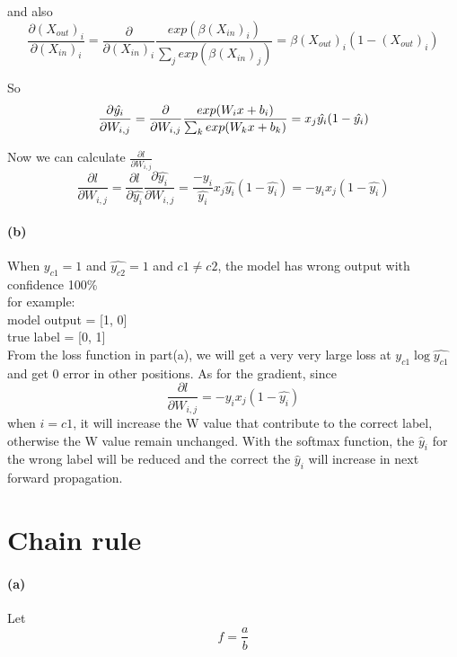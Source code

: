 \documentclass{article}
\begin{document}
and also
\begin{equation}
\frac{\partial (X_{out})_i }{\partial (X_{in})_i }
= \frac{\partial}{\partial (X_{in})_i} \frac{exp(\beta (X_{in})_i)}{\sum\nolimits_j exp(\beta (X_{in})_j)} = \beta (X_{out})_i (1-(X_{out})_i)
\end{equation}

So 
\begin{equation}
\frac{\partial \hat{y_i}}{\partial W_{i,j}} 
= \frac{\partial }{\partial W_{i,j}} \frac{exp(W_{i}x+b_i)}{\sum\nolimits_k exp(W_{k}x+b_k)} \\
= x_{j} \hat{y_i} (1- \hat{y_i})
\end{equation}

Now we can calculate $\frac{\partial l}{\partial W_{i,j}}$
\begin{equation}
\frac{\partial l}{\partial W_{i,j}} = \frac{\partial l}{\partial \hat{y_i}} \frac{\partial \hat{y_i}}{\partial W_{i,j}}
= \frac{-y_i}{\hat{y_i}} x_{j} \hat{y_i} (1- \hat{y_i})
= {-y_i} {x_{j}} (1- \hat{y_i})
\end{equation}


\paragraph{(b)}
When $y_{c1} = 1$ and $\hat{y_{c2}} = 1$ and $c1 \neq c2$, the model has wrong output with confidence 100\% \\
for example: \\
model output = [1, 0] \\ 
true label = [0, 1]  \\

From the loss function in part(a), we will get a very very large loss at $y_{c1} \log \hat{y_{c1}}$ and get 0 error in other positions.
As for the gradient, since
\begin{equation}
\frac{\partial l}{\partial W_{i,j}} = {-y_i} {x_{j}} (1- \hat{y_i})
\end{equation}
when $i=c1$, it will increase the W value that contribute to the correct label, otherwise the W value remain unchanged.
With the softmax function, the $\hat y_i$ for the wrong label will be reduced and the correct the $\hat y_i$ will increase in next forward propagation.


\section{Chain rule}
\paragraph{(a)}
Let
\begin{equation}
f = \frac{a}{b} 
\end{equation}
\end{document}
